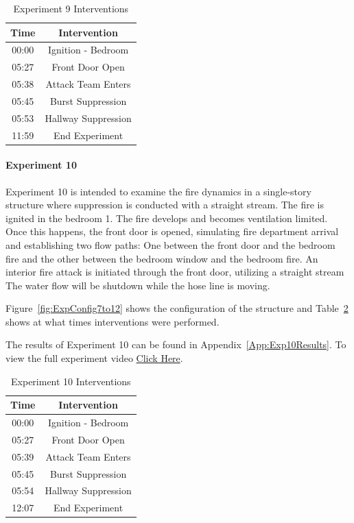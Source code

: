 \documentclass[12pt,oneside]{book}
\begin{document}
\begin{table}[H]
	\centering
	\caption{Experiment 9 Interventions}
	\begin{tabular}{|c|c|} 
		\hline
		Time & Intervention \\ \hline \hline
		00:00 & Ignition - Bedroom \\ \hline
		05:27 & Front Door Open \\ \hline
		05:38 & Attack Team Enters\\ \hline
		05:45 & Burst Suppression \\ \hline 
		05:53 & Hallway Suppression \\ \hline
		11:59 & End Experiment\\ \hline
	\end{tabular}
	\label{Table:Exp9Interventions}
\end{table}

\clearpage

\paragraph{Experiment 10} \mbox{}

Experiment 10 is intended to examine the fire dynamics in a single-story structure where suppression is conducted with a straight stream. The fire is ignited in the bedroom 1. The fire develops and becomes ventilation limited. Once this happens, the front door is opened, simulating fire department arrival and establishing two flow paths: One between the front door and the bedroom fire and the other between the bedroom window and the bedroom fire. An interior fire attack is initiated through the front door, utilizing a straight stream The water flow will be shutdown while the hose line is moving. 

Figure~\ref{fig:ExpConfig7to12} shows the configuration of the structure and Table~\ref{Table:Exp10Interventions} shows at what times interventions were performed. 

The results of Experiment 10 can be found in Appendix~\ref{App:Exp10Results}. To view the full experiment video \href{https://youtu.be/gl8rc1Nsl1k}{Click Here}.

\begin{table}[H]
	\centering
	\caption{Experiment 10 Interventions}
	\begin{tabular}{|c|c|} 
		\hline
		Time & Intervention \\ \hline \hline
		00:00 & Ignition - Bedroom \\ \hline
		05:27 & Front Door Open \\ \hline
		05:39 & Attack Team Enters\\ \hline
		05:45 & Burst Suppression \\ \hline 
		05:54 & Hallway Suppression \\ \hline
		12:07 & End Experiment\\ \hline
	\end{tabular}
	\label{Table:Exp10Interventions}
\end{table}
\end{document}
